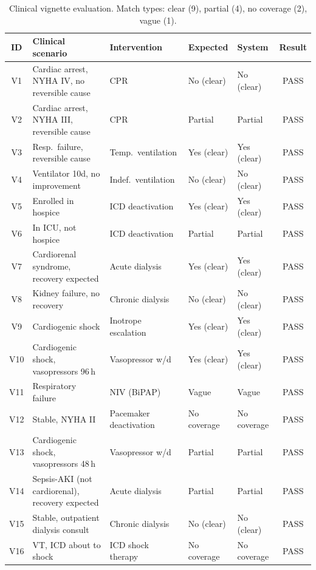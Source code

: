 \documentclass[10pt]{article}
\begin{document}
\begin{table}[ht]
\centering
\caption{Clinical vignette evaluation. Match types: clear (9), partial (4), no coverage (2), vague (1).}
\label{tab:vignettes}
\scriptsize
\renewcommand{\arraystretch}{0.88}
\begin{tabularx}{\textwidth}{c L{4.6cm} L{2.4cm} L{1.8cm} L{1.8cm} c}
\toprule
\textbf{ID} & \textbf{Clinical scenario} & \textbf{Intervention} & \textbf{Expected} & \textbf{System} & \textbf{Result} \\
\midrule
V1 & Cardiac arrest, NYHA IV, no reversible cause & CPR & No (clear) & No (clear) & PASS \\
V2 & Cardiac arrest, NYHA III, reversible cause & CPR & Partial & Partial & PASS \\
V3 & Resp.\ failure, reversible cause & Temp.\ ventilation & Yes (clear) & Yes (clear) & PASS \\
V4 & Ventilator 10d, no improvement & Indef.\ ventilation & No (clear) & No (clear) & PASS \\
V5 & Enrolled in hospice & ICD deactivation & Yes (clear) & Yes (clear) & PASS \\
V6 & In ICU, not hospice & ICD deactivation & Partial & Partial & PASS \\
V7 & Cardiorenal syndrome, recovery expected & Acute dialysis & Yes (clear) & Yes (clear) & PASS \\
V8 & Kidney failure, no recovery & Chronic dialysis & No (clear) & No (clear) & PASS \\
V9 & Cardiogenic shock & Inotrope escalation & Yes (clear) & Yes (clear) & PASS \\
V10 & Cardiogenic shock, vasopressors 96\,h & Vasopressor w/d & Yes (clear) & Yes (clear) & PASS \\
V11 & Respiratory failure & NIV (BiPAP) & Vague & Vague & PASS \\
V12 & Stable, NYHA II & Pacemaker deactivation & No coverage & No coverage & PASS \\
V13 & Cardiogenic shock, vasopressors 48\,h & Vasopressor w/d & Partial & Partial & PASS \\
V14 & Sepsis-AKI (not cardiorenal), recovery expected & Acute dialysis & Partial & Partial & PASS \\
V15 & Stable, outpatient dialysis consult & Chronic dialysis & No (clear) & No (clear) & PASS \\
V16 & VT, ICD about to shock & ICD shock therapy & No coverage & No coverage & PASS \\
\bottomrule
\end{tabularx}
\end{table}
\end{document}
